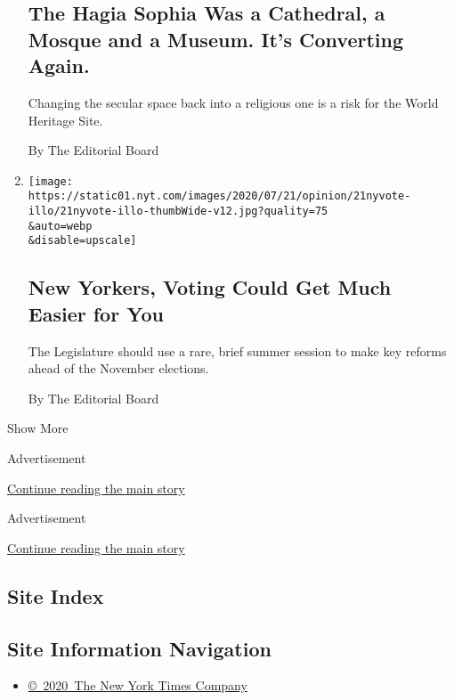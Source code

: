 \begin{enumerate}
{  \subsection{The Hagia Sophia Was a Cathedral, a Mosque and a Museum.
  It's Converting
  Again.}\label{the-hagia-sophia-was-a-cathedral-a-mosque-and-a-museum-its-converting-again}}

  Changing the secular space back into a religious one is a risk for the
  World Heritage Site.

  By The Editorial Board
\item
  \href{/2020/07/21/opinion/new-york-vote.html}{}

  \texttt{[image: https://static01.nyt.com/images/2020/07/21/opinion/21nyvote-illo/21nyvote-illo-thumbWide-v12.jpg?quality=75\\\&auto=webp\\\&disable=upscale]}

  \hypertarget{new-yorkers-voting-could-get-much-easier-for-you}{%
  \subsection{New Yorkers, Voting Could Get Much Easier for
  You}\label{new-yorkers-voting-could-get-much-easier-for-you}}

  The Legislature should use a rare, brief summer session to make key
  reforms ahead of the November elections.

  By The Editorial Board
\end{enumerate}

Show More

Advertisement

\protect\hyperlink{after-mid1}{Continue reading the main story}

Advertisement

\protect\hyperlink{after-mktg}{Continue reading the main story}

\hypertarget{site-index}{%
\subsection{Site Index}\label{site-index}}

\hypertarget{site-information-navigation}{%
\subsection{Site Information
Navigation}\label{site-information-navigation}}

\begin{itemize}
\tightlist
\item
  \href{https://help.nytimes.com/hc/en-us/articles/115014792127-Copyright-notice}{©~2020~The
  New York Times Company}
\end{itemize}

